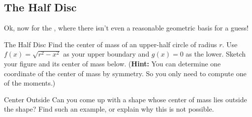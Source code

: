 \subsection{The Half Disc} Ok, now for the , where there isn't even a reasonable geometric basis for a guess!  \begin{exercise}{The Half Disc \Coffeecup \Coffeecup} Find the center of mass of an upper-half circle of radius $r$.  Use $f(x)=\sqrt{r^2-x^2}$ as your upper boundary and $g(x)=0$ as the lower.  Sketch your figure and its center of mass below.  ({\bf Hint:} You can determine one coordinate of the center of mass by symmetry.  So you only need to compute one of the moments.)

\end{exercise}

\begin{exercise}{Center Outside \Coffeecup \Coffeecup \Coffeecup \Coffeecup}
 Can you come up with a shape whose center of mass lies outside the shape?  Find such an example, or explain why this is not possible. 
 \vspace*{3in}
 
\end{exercise}